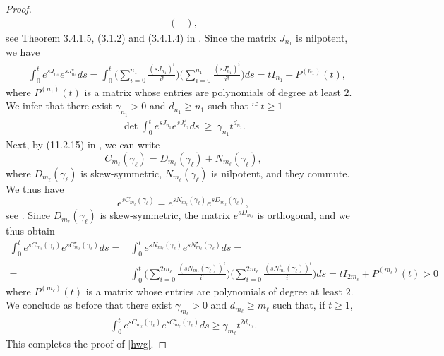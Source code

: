 \documentclass[11pt,letter]{amsart}
\numberwithin{equation}{section}
\numberwithin{equation}{section}
\begin{document}
\begin{proof}
\begin{align*}
\begin{pmatrix}
\end{pmatrix},
\end{align*}
see Theorem 3.4.1.5, (3.1.2) and (3.4.1.4)  in \cite{HJ}. 
Since the matrix $J_{n_{1}}$ is nilpotent, we have 
\begin{align*}
& \int_{0}^{t}e^{sJ_{n_{1}}}e^{sJ^{\star}_{n_{1}}}ds=\int_{0}^{t}\big(\sum_{i=0}^{n_{1}}\frac{(sJ_{n_{1}})^{i}}{i!}\big)\big(\sum_{i=0}^{n_{1}}\frac{(sJ_{n_{1}}^{\star})^{i}}{i!}\big)ds=tI_{n_{1}}+P^{(n_{1})}(t),
\end{align*}
where $P^{(n_{1})}(t)$ is a matrix whose entries are polynomials of degree at least $2$. We infer that
there exist $\gamma_{n_{1}}>0$ and $d_{n_{1}}\ge n_{1}$ such that if $t\ge 1$
\begin{align*}
	\det \int_{0}^{t}e^{sJ_{n_{1}}}e^{sJ_{n_{1}}^{\star}} ds\ \ge\ \gamma_{n_{1}}t^{d_{n_{1}}}.
\end{align*}
Next, by (11.2.15) in \cite{Bernie}, we can write 
\[
C_{m_{\ell}}(\gamma_{\ell}) =D_{m_{\ell}}(\gamma_{\ell})+N_{m_{\ell}}(\gamma_{\ell}),
\]
where $D_{m_{\ell}}(\gamma_{\ell})$ is skew-symmetric, $N_{m_{\ell}}(\gamma_{\ell})$ is nilpotent, and they commute. We thus have 
\[
e^{sC_{m_{\ell}}(\gamma_{\ell})}=e^{sN_{m_{\ell}}(\gamma_{\ell})}e^{sD_{m_{\ell}}(\gamma_{\ell})},
\] 
see \cite[Cor.11.1.6]{Bernie}. 
Since $D_{m_{\ell}}(\gamma_{\ell})$ is skew-symmetric, the matrix $e^{sD_{m_{\ell}}}$ is orthogonal, and we thus obtain
\begin{align*}
	\int_{0}^{t}e^{sC_{m_{\ell}}(\gamma_{\ell})}e^{sC_{m_{\ell}}^{\star}(\gamma_{\ell})}ds=&\int_{0}^{t}e^{sN_{m_{\ell}}(\gamma_{\ell})}e^{sN^{\star}_{m_{\ell}}(\gamma_{\ell})}ds=\\
	=&\int_{0}^{t}\big(\sum_{i=0}^{2m_{\ell}}\frac{(sN_{m_{\ell}}(\gamma_{\ell}))^{i}}{i!}\big)\big(\sum_{i=0}^{2m_{\ell}}\frac{(sN_{m_{\ell}}^{\star}(\gamma_{\ell}))^{i}}{i!}\big)ds=tI_{2m_{\ell}}+P^{(m_{\ell})}(t)>0
\end{align*}
where $P^{(m_{\ell})}(t)$ is a matrix whose entries are polynomials of degree at least $2$.
We conclude as before that there exist $\gamma_{m_{\ell}}>0$ and $d_{m_{\ell}}\ge m_{\ell}$ such that, if $t\ge 1$, 
\begin{align*}
\int_{0}^{t}e^{sC_{m_{\ell}}(\gamma_{\ell})}e^{sC_{m_{\ell}}^{\star}(\gamma_{\ell})}ds \ge \gamma_{m_{\ell}}t^{2d_{m_{\ell}}}.
\end{align*}
This completes the proof of \eqref{hwg}.

\end{proof}
\end{document}
